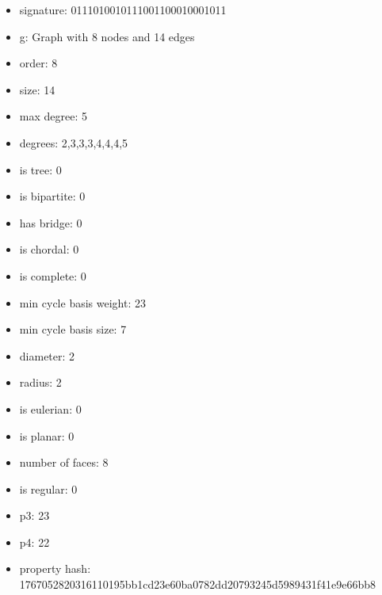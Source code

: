 \begin{itemize}
\item signature: 0111010010111001100010001011
\item g: Graph with 8 nodes and 14 edges
\item order: 8
\item size: 14
\item max degree: 5
\item degrees: 2,3,3,3,4,4,4,5
\item is tree: 0
\item is bipartite: 0
\item has bridge: 0
\item is chordal: 0
\item is complete: 0
\item min cycle basis weight: 23
\item min cycle basis size: 7
\item diameter: 2
\item radius: 2
\item is eulerian: 0
\item is planar: 0
\item number of faces: 8
\item is regular: 0
\item p3: 23
\item p4: 22
\item property hash: 1767052820316110195bb1cd23e60ba0782dd20793245d5989431f41e9e66bb8
\end{itemize}
\newpage
\begin{figure}
\end{figure}
